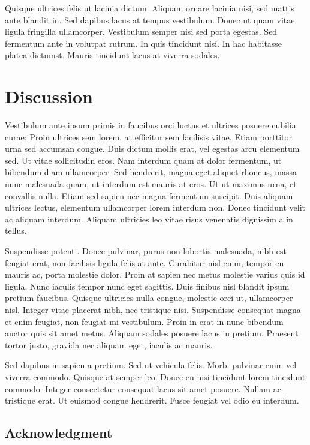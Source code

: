 \documentclass[9pt,biorxiv,doublespacing,lineno]{lapreprint}
\begin{document}
Quisque ultrices felis ut lacinia dictum. Aliquam ornare lacinia nisi,
sed mattis ante blandit in. Sed dapibus lacus at tempus vestibulum.
Donec ut quam vitae ligula fringilla ullamcorper. Vestibulum semper nisi
sed porta egestas. Sed fermentum ante in volutpat rutrum. In quis
tincidunt nisi. In hac habitasse platea dictumst. Mauris tincidunt lacus
at viverra sodales.

\hypertarget{discussion}{%
\section{Discussion}\label{discussion}}

Vestibulum ante ipsum primis in faucibus orci luctus et ultrices posuere
cubilia curae; Proin ultrices sem lorem, at efficitur sem facilisis
vitae. Etiam porttitor urna sed accumsan congue. Duis dictum mollis
erat, vel egestas arcu elementum sed. Ut vitae sollicitudin eros. Nam
interdum quam at dolor fermentum, ut bibendum diam ullamcorper. Sed
hendrerit, magna eget aliquet rhoncus, massa nunc malesuada quam, ut
interdum est mauris at eros. Ut ut maximus urna, et convallis nulla.
Etiam sed sapien nec magna fermentum suscipit. Duis aliquam ultrices
lectus, elementum ullamcorper lorem interdum non. Donec tincidunt velit
ac aliquam interdum. Aliquam ultricies leo vitae risus venenatis
dignissim a in tellus.

Suspendisse potenti. Donec pulvinar, purus non lobortis malesuada, nibh
est feugiat erat, non facilisis ligula felis at ante. Curabitur nisl
enim, tempor eu mauris ac, porta molestie dolor. Proin at sapien nec
metus molestie varius quis id ligula. Nunc iaculis tempor nunc eget
sagittis. Duis finibus nisl blandit ipsum pretium faucibus. Quisque
ultricies nulla congue, molestie orci ut, ullamcorper nisl. Integer
vitae placerat nibh, nec tristique nisi. Suspendisse consequat magna et
enim feugiat, non feugiat mi vestibulum. Proin in erat in nunc bibendum
auctor quis sit amet metus. Aliquam sodales posuere lacus in pretium.
Praesent tortor justo, gravida nec aliquam eget, iaculis ac mauris.

Sed dapibus in sapien a pretium. Sed ut vehicula felis. Morbi pulvinar
enim vel viverra commodo. Quisque at semper leo. Donec eu nisi tincidunt
lorem tincidunt commodo. Integer consectetur consequat lacus sit amet
posuere. Nullam ac tristique erat. Ut euismod congue hendrerit. Fusce
feugiat vel odio eu interdum.

\hypertarget{acknowledgment}{%
\subsection{Acknowledgment}\label{acknowledgment}}
\end{document}
